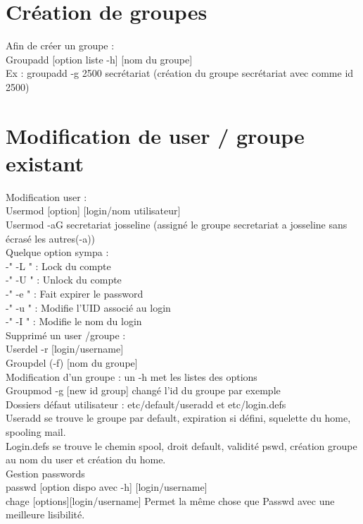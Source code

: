 \documentclass[11pt,a4peper]{article}
\begin{document}
\section{Création de groupes}

Afin de créer un groupe :\\
Groupadd [option liste -h] [nom du groupe]\\
Ex : groupadd -g 2500 secrétariat (création du groupe secrétariat avec comme id 2500) 

\section{Modification de user / groupe existant}

Modification user :\\
Usermod [option] [login/nom utilisateur]\\
Usermod -aG secretariat josseline (assigné le groupe secretariat a josseline sans écrasé les autres(-a))\\
Quelque option sympa :	\\
-" -L " : Lock du compte \\	
-" -U " : Unlock du compte \\
-" -e " : Fait expirer le password\\
-" -u " : Modifie l’UID associé au login \\
-" -I " : Modifie le nom du login\\
Supprimé un user /groupe :\\
Userdel -r [login/username]\\
Groupdel (-f) [nom du groupe]\\
Modification d’un groupe : un -h met les listes des options\\
Groupmod -g [new id group] changé l’id du groupe par exemple\\
Dossiers défaut utilisateur : etc/default/useradd et etc/login.defs\\
Useradd se trouve le groupe par default, expiration si défini, squelette du home, spooling mail.\\
Login.defs se trouve le chemin spool, droit default, validité pswd, création groupe au nom du user et création du home.\\
Gestion passwords\\
passwd [option dispo avec -h] [login/username]\\
chage [options][login/username] Permet la même chose que Passwd avec une meilleure lisibilité.\\
\end{document}
